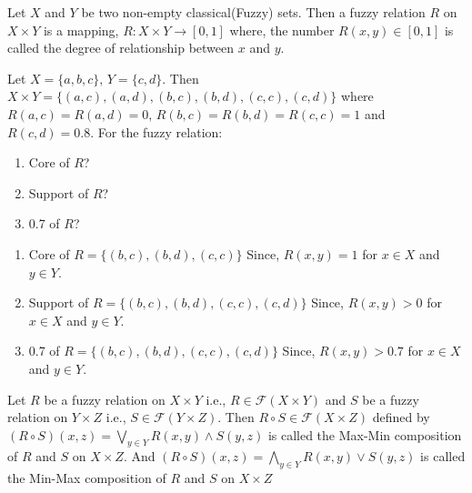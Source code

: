 \documentclass[../main-sheet.tex]{subfiles}
\begin{document}
\begin{defn}
    Let \(X \) and \(Y \) be two non-empty classical(Fuzzy) sets. Then a fuzzy relation \(R \) on \(X\times Y \) is a mapping, \(R:X\times Y\to[0,1]\) where, the number \(R(x,y)\in[0,1]\) is called the degree of relationship between \(x \) and \(y \).
\end{defn}
\begin{ex}
    Let \(X=\{a,b,c \},\, Y=\{c,d \}\). Then \(X\times Y=\{(a,c),(a,d),(b,c),(b,d),(c,c),(c,d )\}\) where \(R(a,c)=R(a,d)=0\), \(R(b,c)=R(b,d)=R(c,c)=1\) and \(R(c,d)=0.8\). For the fuzzy relation:
    \begin{enumerate}
        \item Core of \(R \)?
        \item Support of \(R \)?
        \item 0.7 of \(R \)?
    \end{enumerate}
\end{ex}
\begin{soln}
    \begin{enumerate}
        \item Core of \(R=\{(b,c),(b,d),(c,c )\}\) Since, \(R(x,y)=1\) for \(x\in X \) and \(y\in Y \).
        \item Support of \(R=\{(b,c),(b,d),(c,c ),(c,d)\}\) Since, \(R(x,y)>0\) for \(x\in X \) and \(y\in Y \).
        \item 0.7 of \(R=\{(b,c),(b,d),(c,c ),(c,d)\}\) Since, \(R(x,y)>0.7\) for \(x\in X \) and \(y\in Y \).
    \end{enumerate}
\end{soln}
\begin{defn}
    Let \(R \) be a fuzzy relation on \(X\times Y \) i.e., \(R\in\mathcal{F }(X\times Y )\) and \(S \) be a fuzzy relation on \(Y\times Z \) i.e., \(S\in \mathcal{F }(Y\times Z )\). Then \(R\circ S \in \mathcal{F }(X\times Z)\) defined by \((R\circ S)(x,z)=\bigvee_{y\in Y }R(x,y)\wedge S(y,z )\) is called the Max-Min composition of \(R \) and \(S \) on \(X\times Z \). And \((R\circ S)(x,z)=\bigwedge_{y\in Y }R(x,y)\vee S(y,z )\) is called the Min-Max composition of \(R \) and \(S \) on \(X\times Z \)
\end{defn}
\end{document}
